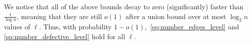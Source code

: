 \documentclass[journal]{IEEEtran}
\theoremstyle{definition}
\theoremstyle{definition}
\newcommand{\EE}{\mathbb{E}}
\newcommand{\PP}{\mathbb{P}}
\newcommand{\kb}{\overline{k}}
\DeclarePairedDelimiter\ceil{\lceil}{\rceil}
\newcommand{\bigO}{\mathcal{O}}
\begin{document}


We notice that all of the above bounds decay to zero (significantly) faster than $\frac{1}{\log n}$, meaning that they are still $o(1)$ after a union bound over at most $\log_2 n$ values of $\ell$.  Thus, with probability $1-o(1)$,~\eqref{eq:number_edges_level} and \eqref{eq:number_defective_level} hold for all $\ell$.
\end{document}
